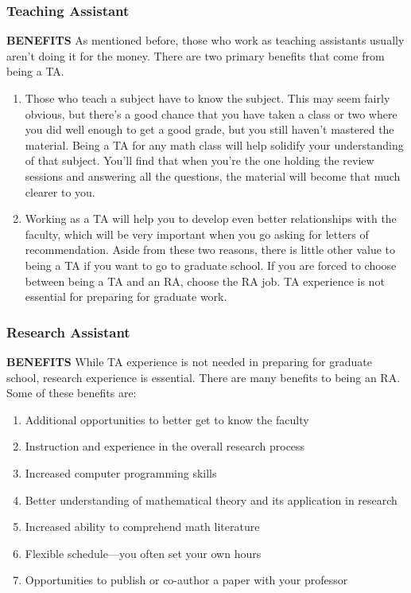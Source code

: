 \documentclass[11pt]{article}
\begin{document}
\subsubsection*{Teaching Assistant}

\textbf{BENEFITS} As mentioned before, those who work as teaching assistants usually aren’t doing it for the money. There are two primary benefits that come from being a TA. 

\begin{enumerate}
\item Those who teach a subject have to know the subject. This may seem fairly obvious, but there’s a good chance that you have taken a class or two where you did well enough to get a good grade, but you still haven’t mastered the material. Being a TA for any math class will help solidify your understanding of that subject. You’ll find that when you’re the one holding the review sessions and answering all the questions, the material will become that much clearer to you. 
\item Working as a TA will help you to develop even better relationships with the faculty, which will be very important when you go asking for letters of recommendation. Aside from these two reasons, there is little other value to being a TA if you want to go to graduate school. If you are forced to choose between being a TA and an RA, choose the RA job. TA experience is not essential for preparing for graduate work. 
\end{enumerate}

\subsubsection*{Research Assistant}

\textbf{BENEFITS} While TA experience is not needed in preparing for graduate school, research experience is essential. There are many benefits to being an RA. Some of these benefits are: 

\begin{enumerate}
\item Additional opportunities to better get to know the faculty 
\item Instruction and experience in the overall research process 
\item Increased computer programming skills 
\item Better understanding of mathematical theory and its application in research 
\item Increased ability to comprehend math literature 
\item Flexible schedule—you often set your own hours 
\item Opportunities to publish or co-author a paper with your professor
\end{enumerate}
\end{document}
